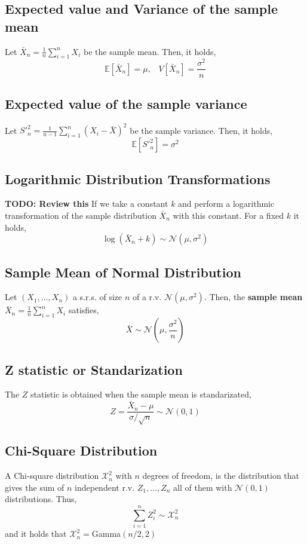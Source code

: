 \subsection{Expected value and Variance of the sample mean}
Let $\bar{X}_n = \frac{1}{n}\sum_{i=1}^n X_i$ be the sample mean. Then, it holds,
\[ \mathbb{E}[\bar{X}_n] = \mu,\;\;\; V[\bar{X}_n] = \frac{\sigma^2}{n} \]

\subsection{Expected value of the sample variance}
Let $S'^2_n = \frac{1}{n-1}\sum_{i=1}^{n} (X_i-\bar{X})^2 $ be the sample variance. Then, it holds,
\[ \mathbb{E}[S'^2_n] = \sigma^2 \]

\subsection{Logarithmic Distribution Transformations}
\textbf{TODO: Review this}
If we take a constant $k$ and perform a logarithmic transformation of the sample distribution $\bar{X}_n$ with this constant. For a fixed $k$ it holds,
\[ \log(\bar{X}_n + k) \sim \mathcal{N}(\mu, \sigma^2) \]

\subsection{Sample Mean of Normal Distribution}
Let $(X_1,\dots,X_n)$ a s.r.s. of size $n$ of a r.v. $\mathcal{N}(\mu,\sigma^2)$. Then, the \textbf{sample mean} $\bar{X}_n = \frac{1}{n}\sum_{i=1}^n X_i$
satisfies,
\[ \bar{X} \sim \mathcal{N}(\mu,\frac{\sigma^2}{n}) \]

\subsection{Z statistic or Standarization}
The $Z$ statistic is obtained when the sample mean is standarizated,
\[ Z = \frac{\bar{X}_n - \mu}{\sigma / \sqrt{n}} \sim \mathcal{N}(0,1) \]

\subsection{Chi-Square Distribution}
A Chi-square distribution $\mathcal{X}_n^2$ with $n$ degrees of freedom, is the distribution that gives the sum of $n$ independent r.v. $Z_1,\dots,Z_n$ all of
them with $\mathcal{N}(0,1)$ distributions. Thus,
\[ \sum_{i=1}^n Z_i^2 \sim \mathcal{X}_n^2 \]
and it holds that $\mathcal{X}^2_n = $Gamma$(n/2,2)$


